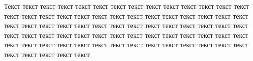 \documentclass[a4paper,12pt]{article} %
\begin{document}
Текст текст текст текст текст текст текст текст текст текст текст текст текст текст текст текст текст текст текст текст текст текст текст текст текст текст текст текст текст текст текст текст текст текст текст текст текст текст текст текст текст текст текст текст текст текст текст текст текст текст текст текст текст текст текст текст текст текст текст текст текст текст текст текст текст текст текст текст текст текст текст текст текст текст текст 


\listoftables %
\end{document}
